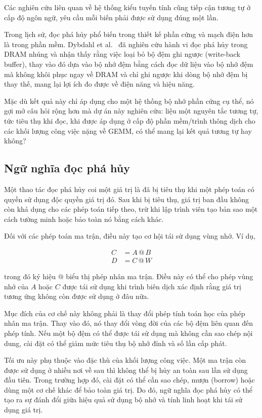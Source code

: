 \documentclass[a4paper]{article}
\begin{document}
	Các nghiên cứu liên quan về hệ thống kiểu tuyến tính cũng tiếp cận tương tự ở cấp độ ngôn ngữ, yêu cầu mỗi biến phải được sử dụng đúng một lần.
	
	Trong lịch sử, đọc phá hủy phổ biến trong thiết kế phần cứng và mạch điện hơn là trong phần mềm. Dybdahl et al.~\cite{DybdahlKGN06} đã nghiên cứu hành vi đọc phá hủy trong DRAM nhúng và nhận thấy rằng việc loại bỏ bộ đệm ghi ngược (write-back buffer), thay vào đó dựa vào bộ nhớ đệm bằng cách đọc dữ liệu vào bộ nhớ đệm mà không khôi phục ngay về DRAM và chỉ ghi ngược khi dòng bộ nhớ đệm bị thay thế, mang lại lợi ích đo được về điện năng và hiệu năng.
	
	Mặc dù kết quả này chỉ áp dụng cho một hệ thống bộ nhớ phần cứng cụ thể, nó gợi mở câu hỏi rộng hơn mà dự án này nghiên cứu: liệu một nguyên tắc tương tự, tức tiêu thụ khi đọc, khi được áp dụng ở cấp độ phần mềm/trình thông dịch cho các khối lượng công việc nặng về GEMM, có thể mang lại kết quả tương tự hay không?
	
	
	\subsection{Ngữ nghĩa đọc phá hủy}
	
	Một thao tác đọc phá hủy coi một giá trị là đã bị tiêu thụ khi một phép toán có quyền sử dụng độc quyền giá trị đó. Sau khi bị tiêu thụ, giá trị ban đầu không còn khả dụng cho các phép toán tiếp theo, trừ khi lập trình viên tạo bản sao một cách tường minh hoặc bảo toàn nó bằng cách khác.
	
	Đối với các phép toán ma trận, điều này tạo cơ hội tái sử dụng vùng nhớ. Ví dụ,
	
	\begin{align*}
		C &= A \mathbin{@} B\\
		D &= C \mathbin{@} W
	\end{align*}
	
	\noindent trong đó ký hiệu $\mathbin{@}$ biểu thị phép nhân ma trận. Điều này có thể cho phép vùng nhớ của $A$ hoặc $C$ được tái sử dụng khi trình biên dịch xác định rằng giá trị tương ứng không còn được sử dụng ở đâu nữa.
	
	Mục đích của cơ chế này không phải là thay đổi phép tính toán học của phép nhân ma trận. Thay vào đó, nó thay đổi vòng đời của các bộ đệm liên quan đến phép tính. Nếu một bộ đệm có thể được tái sử dụng mà không cần sao chép nội dung, cài đặt có thể giảm mức tiêu thụ bộ nhớ đỉnh và số lần cấp phát.
	
	Tối ưu này phụ thuộc vào đặc thù của khối lượng công việc. Một ma trận còn được sử dụng ở nhiều nơi về sau thì không thể bị hủy an toàn sau lần sử dụng đầu tiên. Trong trường hợp đó, cài đặt có thể cần sao chép, mượn (borrow) hoặc dùng một cơ chế khác để bảo toàn giá trị. Do đó, ngữ nghĩa đọc phá hủy có thể tạo ra sự đánh đổi giữa hiệu quả sử dụng bộ nhớ và tính linh hoạt khi tái sử dụng giá trị.
	
\end{document}
